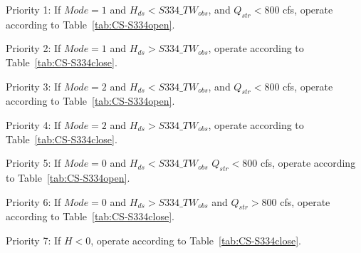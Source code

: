\begin{packed_items}
\item Priority 1: If $Mode=1$ and $H_{ds}<S334\_TW_{obs}$, and $Q_{str}<800$ cfs,  operate according to Table~\ref{tab:CS-S334open}.
\item Priority 2: If $Mode=1$ and $H_{ds}>S334\_TW_{obs}$,  operate according to Table~\ref{tab:CS-S334close}.
\item[]
\item Priority 3: If $Mode=2$ and $H_{ds}<S334\_TW_{obs}$, and $Q_{str}<800$ cfs, operate according to Table~\ref{tab:CS-S334open}.
\item Priority 4: If $Mode=2$ and $H_{ds}>S334\_TW_{obs}$,  operate according to Table~\ref{tab:CS-S334close}.
\item[]
\item Priority 5: If $Mode=0$ and $H_{ds}<S334\_TW_{obs}$  $Q_{str}<800$ cfs,  operate according to Table~\ref{tab:CS-S334open}.
\item Priority 6: If $Mode=0$ and $H_{ds}>S334\_TW_{obs}$ and $Q_{str}>800$ cfs,  operate according to Table~\ref{tab:CS-S334close}.
\item[]
\item Priority 7: If $H<0$, operate according to Table~\ref{tab:CS-S334close}.
\end{packed_items}

%


